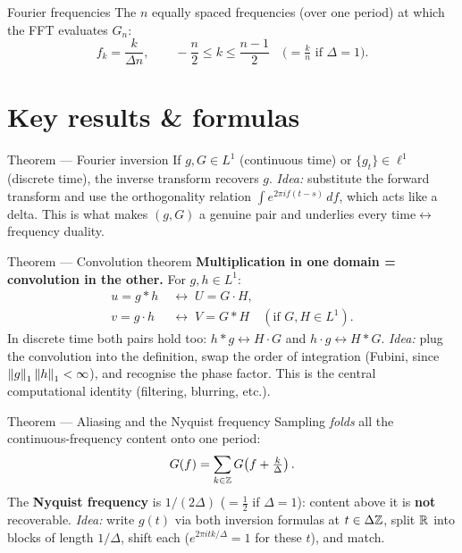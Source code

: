 \documentclass[11pt]{article}
\begin{document}
\begin{defn}{Fourier frequencies}
The $n$ equally spaced frequencies (over one period) at which the FFT evaluates $G_n$:
\[
f_k=\frac{k}{\Delta n},\qquad -\frac{n}{2}\le k\le \frac{n-1}{2}
\quad\Big(=\tfrac{k}{n}\text{ if }\Delta=1\Big).
\]
\end{defn}

\section*{Key results \& formulas}

\begin{result}{Theorem --- Fourier inversion}
If $g,G\in L^1$ (continuous time) or $\{g_t\}\in\ell^1$ (discrete time), the inverse transform recovers $g$. \emph{Idea:} substitute the forward transform and use the orthogonality relation $\int e^{2\pi i f(t-s)}\,df$, which acts like a delta. This is what makes $(g,G)$ a genuine pair and underlies every time$\leftrightarrow$frequency duality.
\end{result}

\begin{result}{Theorem --- Convolution theorem}
\textbf{Multiplication in one domain = convolution in the other.} For $g,h\in L^1$:
\[
\begin{aligned}
u=g*h &\;\longleftrightarrow\; U=G\cdot H,\\
v=g\cdot h &\;\longleftrightarrow\; V=G*H \quad(\text{if }G,H\in L^1).
\end{aligned}
\]
In discrete time both pairs hold too: $h*g\leftrightarrow H\cdot G$ and $h\cdot g\leftrightarrow H*G$. \emph{Idea:} plug the convolution into the definition, swap the order of integration (Fubini, since $\left\lVert g \right\rVert_1\left\lVert h \right\rVert_1<\infty$), and recognise the phase factor. This is the central computational identity (filtering, blurring, etc.).
\end{result}

\begin{result}{Theorem --- Aliasing and the Nyquist frequency}
Sampling \emph{folds} all the continuous-frequency content onto one period:
\[
G(f)=\sum_{k\in\mathbb{Z}} G\!\left(f+\tfrac{k}{\Delta}\right).
\]
The \textbf{Nyquist frequency} is $1/(2\Delta)$ ($=\tfrac12$ if $\Delta=1$): content above it is \textbf{not} recoverable. \emph{Idea:} write $g(t)$ via both inversion formulas at $t\in\Delta\mathbb{Z}$, split $\mathbb{R}$ into blocks of length $1/\Delta$, shift each ($e^{2\pi i tk/\Delta}=1$ for these $t$), and match.
\end{result}
\end{document}
